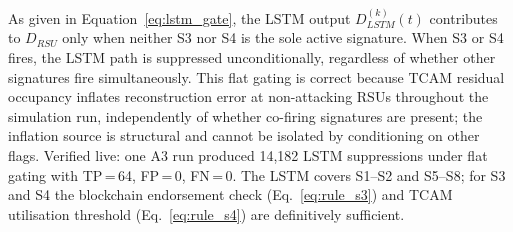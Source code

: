 \documentclass[12pt, a4paper]{report}
\begin{document}
As given in Equation~\eqref{eq:lstm_gate}, the
\ac{LSTM} output $D_{LSTM}^{(k)}(t)$ contributes
to $D_{RSU}$ only when neither S3 nor S4 is the
sole active signature. When S3 or S4 fires, the \ac{LSTM} path is suppressed
unconditionally, regardless of whether other signatures
fire simultaneously. This flat gating is correct because
\ac{TCAM} residual occupancy inflates reconstruction
error at non-attacking \ac{RSU}s throughout the
simulation run, independently of whether co-firing
signatures are present; the inflation source is
structural and cannot be isolated by conditioning on
other flags. Verified live: one A3 run produced
14{,}182 \ac{LSTM} suppressions under flat gating with
TP\,=\,64, FP\,=\,0, FN\,=\,0. The \ac{LSTM}
covers S1--S2 and S5--S8; for S3 and S4 the
blockchain endorsement check
(Eq.~\ref{eq:rule_s3}) and \ac{TCAM} utilisation
threshold (Eq.~\ref{eq:rule_s4}) are definitively
sufficient.
\end{document}
